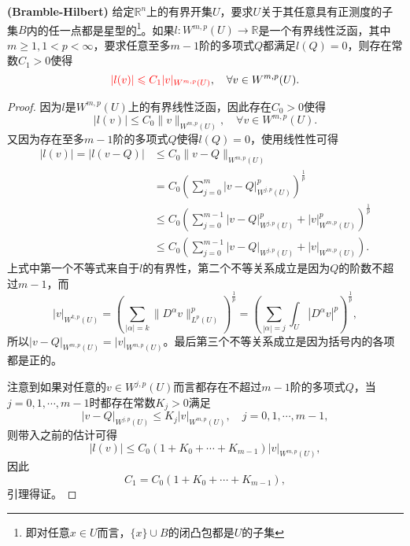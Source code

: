 \documentclass[a4paper,10pt]{ctexart}
\begin{document}
\begin{lemma}{\normalfont\bf{(Bramble-Hilbert)}}\label{lem:Bramble-Hilbert}
    给定$ \mathbb{R}^n $上的有界开集$ U $，要求$ U $关于其任意具有正测度的子集$ B $内的任一点都是星型的\footnote{即对任意$ x\in U $而言，$ \{x\}\cup B $的闭凸包都是$ U $的子集}。如果$ l:W^{m,p}(U)\to \mathbb{R} $是一个有界线性泛函，其中$ m\geqslant 1,1<p<\infty $，要求任意至多$ m-1 $阶的多项式$ Q $都满足$ l(Q) = 0 $，则存在常数$ C_1>0 $使得
    \begin{equation}
        \textcolor{red}{|l(v)| \leqslant C_1 |v|_{W^{m,p}(U)}},\quad \forall v\in W^{m,p}(U).
    \end{equation}
\end{lemma}
\begin{proof}
    因为$ l $是$ W^{m,p}(U) $上的有界线性泛函，因此存在$ C_0>0 $使得
    \begin{equation}
        |l(v)| \leqslant C_0 \| v \|_{W^{m,p}(U)},\quad \forall v\in W^{m,p}(U).
    \end{equation}
    又因为存在至多$ m-1 $阶的多项式$ Q $使得$ l(Q) = 0 $，使用线性性可得
    \[
        \begin{aligned}
            |l(v)| = |l(v - Q)| &\leqslant C_0 \| v-Q \|_{W^{m,p}(U)} \\
            &= C_0 \left( \sum_{j=0}^m |v-Q|_{W^{j,p}(U)}^p \right)^{\frac{1}{p}}\\
            &\leqslant C_0 \left( \sum_{j=0}^{m-1} |v-Q|_{W^{j,p}(U)}^p + |v|_{W^{m,p}(U)}^p \right)^{\frac{1}{p}} \\
            &\leqslant C_0 \left( \sum_{j=0}^{m-1} |v-Q|_{W^{j,p}(U)} + |v|_{W^{m,p}(U)} \right).
        \end{aligned}
    \]
    上式中第一个不等式来自于$ l $的有界性，第二个不等关系成立是因为$ Q $的阶数不超过$ m-1 $，而
    \[
        |v|_{W^{k,p}(U)} = \left( \sum_{|\alpha|=k} \| D^\alpha v \|_{L^p(U)}^p \right)^{\frac{1}{p}}  = \left(\sum_{|\alpha|=j} \int_U |D^\alpha v|^p \right)^{\frac{1}{p}},
    \]
    所以$ |v-Q|_{W^{m,p}(U)} = |v|_{W^{m,p}(U)} $。最后第三个不等关系成立是因为括号内的各项都是正的。

    注意到如果对任意的$ v\in W^{j,p}(U) $而言都存在不超过$ m-1 $阶的多项式$ Q $，当$ j=0,1,\cdots ,m-1 $时都存在常数$ K_j>0 $满足
    \begin{equation}\label{eq:ToBeProve}
        |v-Q|_{W^{j,p}(U)} \leqslant  K_j |v|_{W^{m,p}(U)},\quad j=0,1,\cdots ,m-1,
    \end{equation}
    则带入之前的估计可得
    \begin{equation}
        |l(v)| \leqslant C_0(1+K_0+\cdots +K_{m-1})|v|_{W^{m,p}(U)},
    \end{equation}
    因此
    \[
        C_1 = C_0(1+K_0+\cdots +K_{m-1}),
    \]
    引理得证。
\end{proof}
\end{document}
